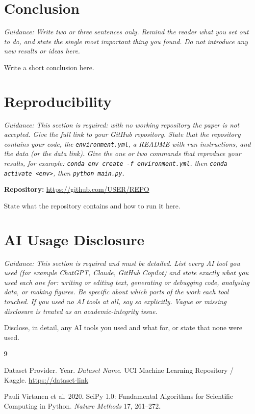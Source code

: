 \documentclass[sigconf,nonacm]{acmart}
\newcommand{\guidance}[1]{\par{\small\color{guide}\textit{Guidance: #1}}\par\medskip}
\begin{document}
\section{Conclusion}
\guidance{Write two or three sentences only. Remind the reader what you set out
to do, and state the single most important thing you found. Do not introduce any
new results or ideas here.}
Write a short conclusion here.

\section{Reproducibility}
\guidance{This section is required: with no working repository the paper is not
accepted. Give the full link to your GitHub repository. State that the
repository contains your code, the \texttt{environment.yml}, a README with run
instructions, and the data (or the data link). Give the one or two commands that
reproduce your results, for example: \texttt{conda env create -f
environment.yml}, then \texttt{conda activate <env>}, then \texttt{python
main.py}.}
\textbf{Repository:} \url{https://github.com/USER/REPO}

State what the repository contains and how to run it here.

\section{AI Usage Disclosure}
\guidance{This section is required and must be detailed. List every AI tool you
used (for example ChatGPT, Claude, GitHub Copilot) and state exactly what you
used each one for: writing or editing text, generating or debugging code,
analysing data, or making figures. Be specific about which parts of the work
each tool touched. If you used no AI tools at all, say so explicitly. Vague or
missing disclosure is treated as an academic-integrity issue.}
Disclose, in detail, any AI tools you used and what for, or state that none were
used.

\begin{thebibliography}{9}

Dataset Provider. Year.
\textit{Dataset Name}.
UCI Machine Learning Repository / Kaggle.
\url{https://dataset-link}

Pauli Virtanen et al. 2020.
SciPy 1.0: Fundamental Algorithms for Scientific Computing in Python.
\textit{Nature Methods} 17, 261--272.

\end{thebibliography}
\end{document}

